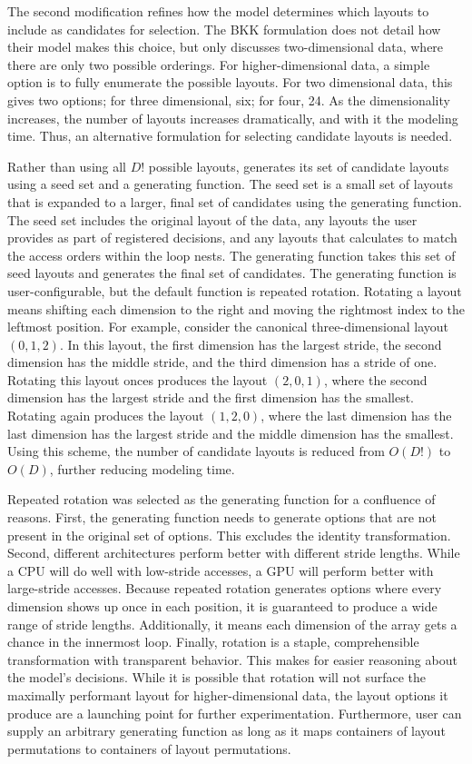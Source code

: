 The second modification refines how the model determines which layouts to include as candidates for selection.
The BKK formulation does not detail how their model makes this choice, but only discusses two-dimensional data, where there are only two possible orderings.
For higher-dimensional data, a simple option is to fully enumerate the possible layouts.
For two dimensional data, this gives two options; for three dimensional, six; for four, 24.
As the dimensionality increases, the number of layouts increases dramatically, and with it the modeling time.
Thus, an alternative formulation for selecting candidate layouts is needed.

Rather than using all $D!$ possible layouts, \FormatDecisions{} generates its set of candidate layouts using a seed set and a generating function.
The seed set is a small set of layouts that is expanded to a larger, final set of candidates using the generating function.
The seed set includes the original layout of the data, any layouts the user provides as part of registered decisions, and any layouts that \FormatDecisions{} calculates to match the access orders within the loop nests.
The generating function takes this set of seed layouts and generates the final set of candidates.
The generating function is user-configurable, but the default function is repeated rotation.
Rotating a layout means shifting each dimension to the right and moving the rightmost index to the leftmost position.
For example, consider the canonical three-dimensional layout $(0,1,2)$. 
In this layout, the first dimension has the largest stride, the second dimension has the middle stride, and the third dimension has a stride of one.
Rotating this layout onces produces the layout $(2,0,1)$, where the second dimension has the largest stride and the first dimension has the smallest.
Rotating again produces the layout $(1,2,0)$, where the last dimension has the last dimension has the largest stride and the middle dimension has the smallest.
Using this scheme, the number of candidate layouts is reduced from $O(D!)$ to $O(D)$, further reducing modeling time.

Repeated rotation was selected as the generating function for a confluence of reasons.
First, the generating function needs to generate options that are not present in the original set of options.
This excludes the identity transformation.
Second, different architectures perform better with different stride lengths.
While a CPU will do well with low-stride accesses, a GPU will perform better with large-stride accesses.
Because repeated rotation generates options where every dimension shows up once in each position, it is guaranteed to produce a wide range of stride lengths.
Additionally, it means each dimension of the array gets a chance in the innermost loop.
Finally, rotation is a staple, comprehensible transformation with transparent behavior.
This makes for easier reasoning about the model's decisions.
While it is possible that rotation will not surface the maximally performant layout for higher-dimensional data, the layout options it produce are a launching point for further experimentation.
Furthermore, user can supply an arbitrary generating function as long as it maps containers of layout permutations to containers of layout permutations.

